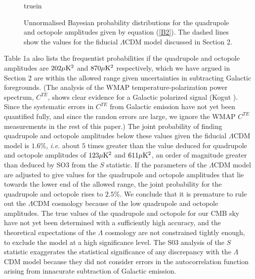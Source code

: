 \begin{figure}

 truein



\caption
{Unnormalised Bayesian probability distributions for the quadrupole and octopole
amplitudes given by equation (\ref{B2}). The dashed lines show the values for
the fiducial $\Lambda$CDM model discussed in Section 2.  }

\label{figure3}

\end{figure}

 Table 1a also lists the frequentist probabilities if the
quadrupole and octopole amplitudes are $202 \mk2$ and $870 \mk2$
respectively, which we have argued in Section 2 are within the allowed
range given uncertainties in subtracting Galactic
foregrounds. (The analysis of the WMAP temperature-polarization
power spectrum, $C^{TE}$, shows clear evidence for a Galactic
polarized signal (Kogut ). Since the systematic errors in $C^{TE}$ from
Galactic emission have not yet been quantified fully, and since the
randon errors are large, we ignore the WMAP $C^{TE}$ measurements in
the rest of this paper.) The joint probability of finding quadrupole
and octopole amplitudes below these values given the fiducial
$\Lambda$CDM model is $1.6\%$, {\it i.e.} about $5$ times greater than
the value deduced for quadrupole and octopole amplitudes of $123 \mk2$
and $611 \mk2$, an order of magnitude greater than deduced by SO3 from
the $S$ statistic. If the parameters of the $\Lambda$CDM model are
adjusted to give values for the quadrupole and octopole amplitudes that
lie towards the lower end of the allowed range, the joint probability
for the quadrupole and octopole rises to $2.5\%$. We conclude that it
is premature to rule out the $\Lambda$CDM cosmology because of the low
quadrupole and octopole amplitudes.  The true values of the quadrupole
and octopole for our CMB sky have not yet been determined with a
sufficiently high accuracy, and the theoretical expectations of the
$\Lambda$ cosmology are not constrained tightly enough, to exclude the
model at a high significance level. The S03 analysis of the $S$
statistic exaggerates the statistical significance of any discrepancy
with the $\Lambda$CDM model because they did not consider
errors in the autocorrelation function arising from
innacurate subtraction of  Galactic emission.



